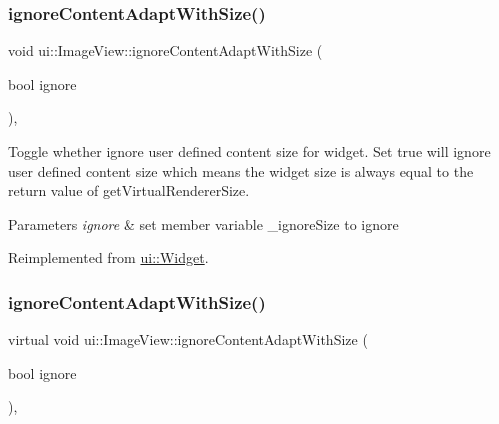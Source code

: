 \mbox{\label{classui_1_1ImageView_a0c1dbff2c1c5d14ac45f76d6daffadb5}} 
\subsubsection{\texorpdfstring{ignore\+Content\+Adapt\+With\+Size()}{ignoreContentAdaptWithSize()}\hspace{0.1cm}{\footnotesize\ttfamily [1/2]}}
{\footnotesize\ttfamily void ui\+::\+Image\+View\+::ignore\+Content\+Adapt\+With\+Size (\begin{DoxyParamCaption}\item[{bool}]{ignore }\end{DoxyParamCaption})\hspace{0.3cm}{\ttfamily [override]}, {\ttfamily [virtual]}}

Toggle whether ignore user defined content size for widget. Set true will ignore user defined content size which means the widget size is always equal to the return value of {\ttfamily get\+Virtual\+Renderer\+Size}.


\begin{DoxyParams}{Parameters}
{\em ignore} & set member variable \+\_\+ignore\+Size to ignore \\
\hline
\end{DoxyParams}


Reimplemented from \hyperlink{classui_1_1Widget_a47ec556e48f2ac20290c197e30434d36}{ui\+::\+Widget}.

\mbox{\label{classui_1_1ImageView_ac9fea31a3800b0960189d168d90ccb19}} 
\subsubsection{\texorpdfstring{ignore\+Content\+Adapt\+With\+Size()}{ignoreContentAdaptWithSize()}\hspace{0.1cm}{\footnotesize\ttfamily [2/2]}}
{\footnotesize\ttfamily virtual void ui\+::\+Image\+View\+::ignore\+Content\+Adapt\+With\+Size (\begin{DoxyParamCaption}\item[{bool}]{ignore }\end{DoxyParamCaption})\hspace{0.3cm}{\ttfamily [override]}, {\ttfamily [virtual]}}


